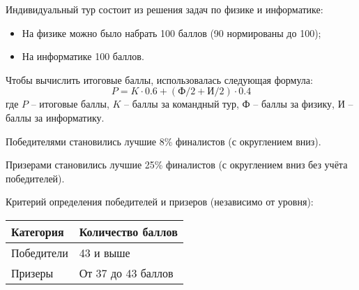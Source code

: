 Индивидуальный тур состоит из решения задач по физике и информатике:
\begin{itemize}
    \item На физике можно было набрать 100 баллов (90 нормированы до 100);
    \item На информатике 100 баллов.
\end{itemize}

Чтобы вычислить итоговые баллы, использовалась следующая формула:
$$P = K \cdot 0.6 + (\text{Ф}/2+\text{И}/2) \cdot 0.4$$
где $P$ – итоговые баллы, $K$ – баллы за командный тур, $\text{Ф}$ – баллы за физику, $\text{И}$ –
баллы за информатику.

Победителями становились лучшие 8\% финалистов (с округлением вниз).

Призерами становились лучшие 25\% финалистов (с округлением вниз без учёта победителей).

Критерий определения победителей и призеров (независимо от уровня):
\begin{center}
    \begin{tabular}{|l|l|}
        \hline
        Категория& Количество баллов\\
        \hline
        Победители&43 и выше\\
        \hline
        Призеры&От 37 до 43 баллов \\
        \hline
    \end{tabular}
\end{center}

